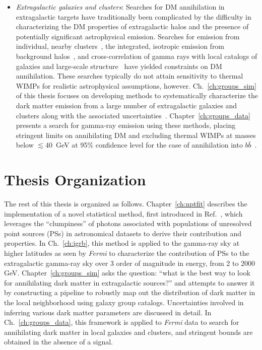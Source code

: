 \begin{itemize}
\item \emph{Extragalactic galaxies and clusters}: Searches for DM annihilation in extragalactic targets have traditionally been complicated by the difficulty in characterizing the DM properties of extragalactic halos and the presence of potentially significant astrophysical emission. Searches for emission from individual, nearby clusters~\cite{Ackermann:2015fdi}, the integrated, isotropic emission from background halos~\cite{Ackermann:2015tah,Ajello:2015mfa,Cholis:2013ena,DiMauro:2015tfa}, and cross-correlation of gamma rays with local catalogs of galaxies and large-scale structure~\cite{Ando:2013xwa,Ando:2014aoa,Ando:2016ang,Cuoco:2015rfa,Regis:2015zka,Xia:2015wka} have yielded constraints on DM annihilation. These searches typically do not attain sensitivity to thermal WIMPs for realistic astrophysical assumptions, however. Ch.~\ref{ch:groups_sim} of this thesis focuses on developing methods to systematically characterize the dark matter emission from a large number of extragalactic galaxies and clusters along with the associated uncertainties~\cite{Lisanti:2017qoz}. Chapter~\ref{ch:groups_data} presents a search for gamma-ray emission using these methods, placing stringent limits on annihilating DM and excluding thermal WIMPs at masses below $\lesssim 40$~GeV at 95\% confidence level for the case of annihilation into $b\bar b$~\cite{Lisanti:2017qlb}. 
\end{itemize}

\section{Thesis Organization}
\label{sec:summary}

The rest of this thesis is organized as follows. Chapter~\ref{ch:nptfit} describes the implementation of a novel statistical method, first introduced in Ref.~\cite{Lee:2015fea}, which leverages the ``clumpiness'' of photons associated with populations of unresolved point sources (PSs) in astronomical datasets to derive their contribution and properties. In Ch.~\ref{ch:igrb}, this method is applied to the gamma-ray sky at higher latitudes as seen by \emph{Fermi} to characterize the contribution of PSs to the extragalactic gamma-ray sky over 3 order of magnitude in energy, from 2 to 2000 GeV. Chapter~\ref{ch:groups_sim} asks the question: ``what is the best way to look for annihilating dark matter in extragalactic sources?'' and attempts to answer it by constructing a pipeline to robustly map out the distribution of dark matter in the local neighborhood using galaxy group catalogs. Uncertainties involved in inferring various dark matter parameters are discussed in detail. In Ch.~\ref{ch:groups_data}, this framework is applied to \emph{Fermi} data to search for annihilating dark matter in local galaxies and clusters, and stringent bounds are obtained in the absence of a signal. 



